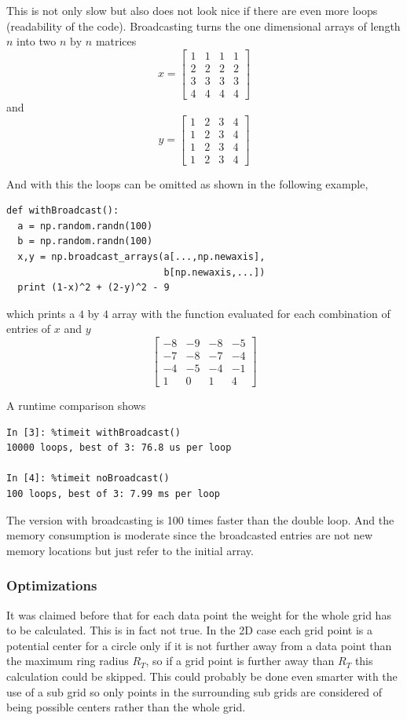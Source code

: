 \documentclass[11pt]{scrreprt}
\begin{document}
This is not only slow but also does not look nice if there are even more loops (readability of the code).
Broadcasting turns the one dimensional arrays of length $n$ into two $n\text{ by }n$ matrices
\[
  x = \begin{bmatrix}
  1 & 1 & 1 & 1 \\
  2 & 2 & 2 & 2 \\
  3 & 3 & 3 & 3\\
  4 & 4 & 4 & 4
  \end{bmatrix}
\]
and
\[
  y = \begin{bmatrix}
  1 & 2 & 3 & 4 \\
  1 & 2 & 3 & 4 \\
  1 & 2 & 3 & 4 \\
  1 & 2 & 3 & 4 
\end{bmatrix}
\]
\noindent\begin{minipage}{\linewidth}
And with this the loops can be omitted as shown in the following example,
\begin{lstlisting}
def withBroadcast():
  a = np.random.randn(100)
  b = np.random.randn(100) 
  x,y = np.broadcast_arrays(a[...,np.newaxis],
                            b[np.newaxis,...])
  print (1-x)^2 + (2-y)^2 - 9
\end{lstlisting}  
\end{minipage}
which prints a $4$ by $4$ array with the function evaluated for each combination of entries of $x$ and $y$
\[
  \begin{bmatrix}
    -8& -9& -8& -5\\
    -7& -8& -7& -4\\
    -4& -5& -4& -1\\
     1&  0&  1&  4
       \end{bmatrix}
\]
%
\begin{minipage}{\linewidth}
A runtime comparison shows   
\begin{lstlisting}
In [3]: %timeit withBroadcast()
10000 loops, best of 3: 76.8 us per loop

In [4]: %timeit noBroadcast()
100 loops, best of 3: 7.99 ms per loop
\end{lstlisting}
The version with broadcasting is 100 times faster than the double loop. And the memory consumption is moderate since the 
broadcasted entries are not new memory locations but just refer to the initial array.
\end{minipage}


\subsubsection{Optimizations} %
\label{ssub:optimizations}
It was claimed before that for each data point the weight for the whole grid has to be calculated. This is in fact not true. In the 2D case 
each grid point is a potential center for a circle only if it is not further away from a data point than the maximum ring radius $R_T$, 
so if a grid point is further away than $R_T$ this calculation could be skipped. This could probably be done even smarter with the use of a 
sub grid so only points in the surrounding sub grids are considered of being possible centers rather than the whole grid.
\end{document}

